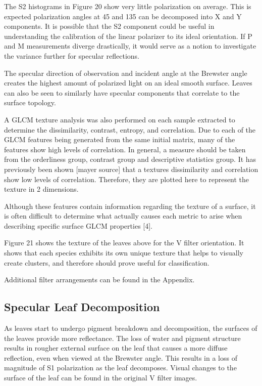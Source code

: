 The S2 histograms in Figure 20 show very little polarization on average.  This is expected polarization angles at 45 and 135 can be decomposed into X and Y components.  It is possible that the S2 component could be useful in understanding the calibration of the linear polarizer to its ideal orientation.  If P and M measurements diverge drastically, it would serve as a notion to investigate the variance further for specular reflections.
%
\begin{center}
\end{center}
%
The specular direction of observation and incident angle at the Brewster angle creates the highest amount of polarized light on an ideal smooth surface.  Leaves can also be seen to similarly have specular components that correlate to the surface topology.

A GLCM texture analysis was also performed on each sample extracted to determine the dissimilarity, contrast, entropy, and correlation. Due to each of the GLCM features being generated from the same initial matrix, many of the features show high levels of correlation.  In general, a measure should be taken from the orderliness group, contrast group and descriptive statistics group. It has previously been shown [mayer source] that a textures dissimilarity and correlation show low levels of correlation.  Therefore, they are plotted here to represent the texture in 2 dimensions.

Although these features contain information regarding the texture of a surface, it is often difficult to determine what actually causes each metric to arise when describing specific surface GLCM properties [4].

Figure 21 shows the texture of the leaves above for the V filter orientation.  It shows that each species exhibits its own unique texture that helps to visually create clusters, and therefore should prove useful for classification.
%
\begin{center}
\end{center}
%
Additional filter arrangements can be found in the Appendix.

\subsection{Specular Leaf Decomposition}
As leaves start to undergo pigment breakdown and decomposition, the surfaces of the leaves provide more reflectance.  The loss of water and pigment structure results in rougher external surface on the leaf that causes a more diffuse reflection, even when viewed at the Brewster angle.  This results in a loss of magnitude of S1 polarization as the leaf decomposes.  Visual changes to the surface of the leaf can be found in the original V filter images.

